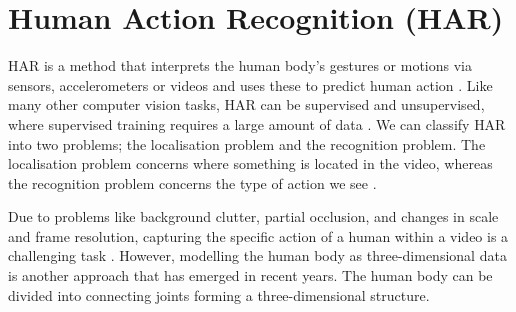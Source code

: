 \section{Human Action Recognition (HAR)}
\gls{HAR} is a method that interprets the human body's gestures or motions via sensors, accelerometers or videos and uses these to predict human action \autocite{jobanputra2019human}. Like many other computer vision tasks, \gls{HAR} can be supervised and unsupervised, where supervised training requires a large amount of data \autocite{ann2014human}. We can classify \gls{HAR} into two problems; the localisation problem and the recognition problem. The localisation problem concerns where something is located in the video, whereas the recognition problem concerns the type of action we see \autocite{vrigkas2015review}. 

Due to problems like background clutter, partial occlusion, and changes in scale and frame resolution, capturing the specific action of a human within a video is a challenging task \autocite{vrigkas2015review}. However, modelling the human body as three-dimensional data is another approach that has emerged in recent years. The human body can be divided into connecting joints forming a three-dimensional structure.  